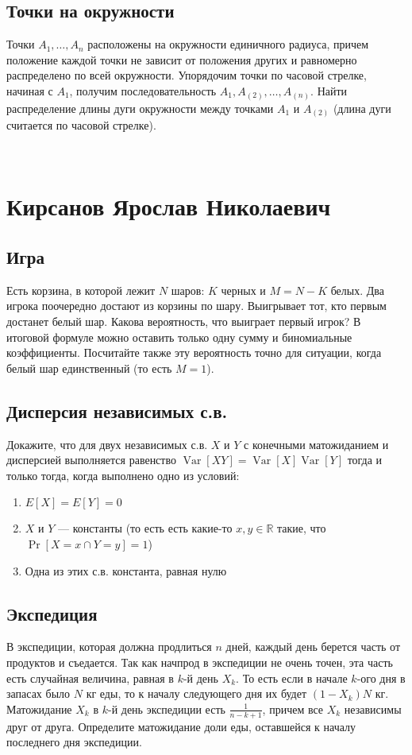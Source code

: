 \documentclass[12pt]{article}
\newcommand\R{\mathbb{R}}
\DeclareMathOperator{\Var}{Var}
\begin{document}
\subsection{Точки на окружности}
Точки $A_1, \dots, A_n$ расположены на окружности единичного радиуса, причем положение каждой точки не зависит от положения других и равномерно распределено по всей окружности. Упорядочим точки по часовой стрелке, начиная с $A_1$, получим последовательность $A_1, A_{(2)}, \dots, A_{(n)}$. Найти распределение длины дуги окружности между точками $A_1$ и $A_{(2)}$ (длина дуги считается по часовой стрелке).

\newpage
~
\newpage
\section{Кирсанов Ярослав Николаевич}

\subsection{Игра}
Есть корзина, в которой лежит $N$ шаров: $K$ черных и $M = N - K$ белых. Два игрока поочередно достают из корзины по шару. Выигрывает тот, кто первым достанет белый шар. Какова вероятность, что выиграет первый игрок? В итоговой формуле можно оставить только одну сумму и биномиальные коэффициенты. Посчитайте также эту вероятность точно для ситуации, когда белый шар единственный (то есть $M = 1$).

\subsection{Дисперсия независимых с.в.}
Докажите, что для двух независимых с.в. $X$ и $Y$ с конечными матожиданием и дисперсией выполняется равенство $\Var[XY] = \Var[X]\Var[Y]$ тогда и только тогда, когда выполнено одно из условий:
\begin{enumerate}
    \item $E[X] = E[Y] = 0$
    \item $X$ и $Y$ --- константы (то есть есть какие-то $x, y \in \R$ такие, что $\Pr[X = x \cap Y = y] = 1$)
    \item Одна из этих с.в. константа, равная нулю
\end{enumerate}

\subsection{Экспедиция}
В экспедиции, которая должна продлиться $n$ дней, каждый день берется часть от продуктов и съедается. Так как начпрод в экспедиции не очень точен, эта часть есть случайная величина, равная в $k$-й день $X_k$. То есть если в начале $k$-ого дня в запасах было $N$ кг еды, то к началу следующего дня их будет $(1 - X_k)N$ кг. Матожидание $X_k$ в $k$-й день экспедиции есть $\frac{1}{n - k + 1}$, причем все $X_k$ независимы друг от друга. Определите матожидание доли еды, оставшейся к началу последнего дня экспедиции.
\end{document}
